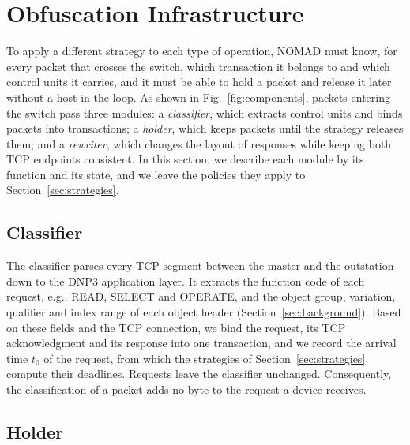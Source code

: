 \section{Obfuscation Infrastructure}
\label{sec:infrastructure}

To apply a different strategy to each type of operation, NOMAD must know, for every packet that crosses the switch, which transaction it belongs to and which control units it carries, and it must be able to hold a packet and release it later without a host in the loop. As shown in Fig.~\ref{fig:components}, packets entering the switch pass three modules: a \emph{classifier}, which extracts control units and binds packets into transactions; a \emph{holder}, which keeps packets until the strategy releases them; and a \emph{rewriter}, which changes the layout of responses while keeping both TCP endpoints consistent. In this section, we describe each module by its function and its state, and we leave the policies they apply to Section~\ref{sec:strategies}.

\subsection{Classifier}

The classifier parses every TCP segment between the master and the outstation down to the DNP3 application layer. It extracts the function code of each request, e.g., READ, SELECT and OPERATE, and the object group, variation, qualifier and index range of each object header (Section~\ref{sec:background}). Based on these fields and the TCP connection, we bind the request, its TCP acknowledgment and its response into one transaction, and we record the arrival time $t_0$ of the request, from which the strategies of Section~\ref{sec:strategies} compute their deadlines. Requests leave the classifier unchanged. Consequently, the classification of a packet adds no byte to the request a device receives.

\subsection{Holder}
\label{sec:holder}

